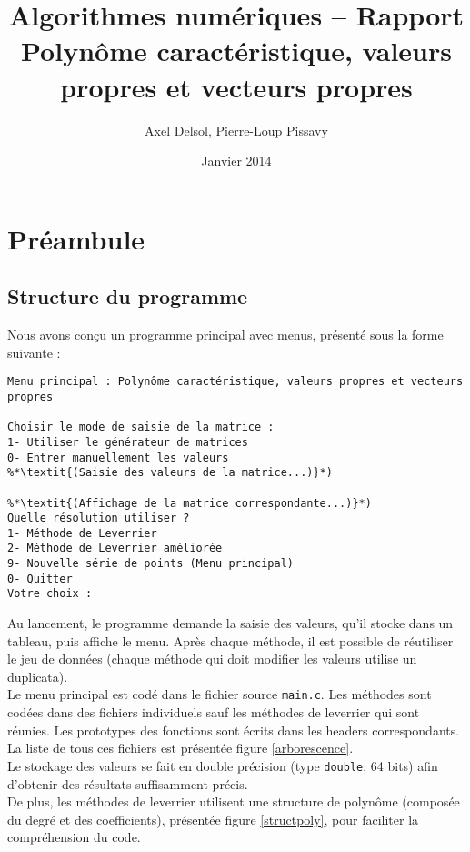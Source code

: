 \documentclass{report}
\title{Algorithmes numériques -- Rapport \\ \vspace{0.5cm}Polynôme caractéristique, valeurs propres et vecteurs propres}
\author{Axel Delsol, Pierre-Loup Pissavy}
\date{Janvier 2014}
\begin{document}
  \maketitle
  \tableofcontents
  
  \chapter{Préambule}
    \section{Structure du programme}
    Nous avons conçu un programme principal avec menus, présenté sous la forme suivante :
      \begin{lstlisting}[style=apercu, name=Menu Principal]
Menu principal : Polynôme caractéristique, valeurs propres et vecteurs propres

Choisir le mode de saisie de la matrice : 
1- Utiliser le générateur de matrices
0- Entrer manuellement les valeurs
%*\textit{(Saisie des valeurs de la matrice...)}*)

%*\textit{(Affichage de la matrice correspondante...)}*)
Quelle résolution utiliser ?
1- Méthode de Leverrier
2- Méthode de Leverrier améliorée
9- Nouvelle série de points (Menu principal)
0- Quitter
Votre choix :
      \end{lstlisting}
      
      Au lancement, le programme demande la saisie des valeurs, qu'il stocke dans un tableau, puis affiche le menu. Après chaque méthode, il est possible de réutiliser le jeu de données (chaque méthode qui doit modifier les valeurs utilise un duplicata). \\

Le menu principal est codé dans le fichier source \verb"main.c". Les méthodes sont codées dans des fichiers individuels sauf les méthodes de leverrier qui sont réunies. Les prototypes des fonctions sont écrits dans les headers correspondants. 
La liste de tous ces fichiers est présentée figure \ref{arborescence}.\\

Le stockage des valeurs se fait en double précision (type \verb"double", 64 bits) afin d'obtenir des résultats suffisamment précis.\\
De plus, les méthodes de leverrier utilisent une structure de polynôme (composée du degré et des coefficients), présentée figure \ref{structpoly}, pour faciliter la compréhension du code.


\newpage

\end{document}
